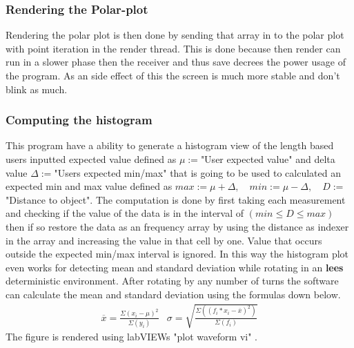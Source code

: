 \subsubsection{Rendering the Polar-plot}\label{subsubsection:renderPolar}
Rendering the polar plot is then done by sending that array in to the polar plot with point iteration\cite{labVIEW-polar-plot} in the render thread.
This is done because then render can run in a slower phase then the receiver and thus save decrees the power usage of the program.
As an side effect of this the screen is much more stable and don't blink as much.

\subsubsection{Computing the histogram}\label{subsubsection:comphistogram}
This program have a ability to generate a histogram view of the length based users inputted expected value defined as $\mu:=$"User expected value" and delta value $\Delta:=$"Users expected min/max" that is going to be used to calculated an expected min and max value defined as $ max:=\mu+\Delta,\quad min:=\mu-\Delta, \quad D:=$"Distance to object".
The computation is done by first taking each measurement and checking if the value of the data is in the interval of $ (min \leq D \leq max) $ then if so restore the data as an frequency array by using the distance as indexer in the array and increasing the value in that cell by one.
Value that occurs outside the expected min/max interval is ignored.
In this way the histogram plot even works for detecting mean and standard deviation while rotating in an \textbf{lees} deterministic environment.
After rotating by any number of turns the software can calculate the mean and standard deviation using the formulas down below.
$$\begin{matrix} 
\overline{x}=\frac{\Sigma(x_i-\mu)^2}{\Sigma(y_i)} & 
\sigma= \sqrt{\frac{\Sigma((f_i*x_i-\overline{x})^2)}{\Sigma(f_i)}}
\end{matrix}\label{equation:mean-and-div}$$
The figure is rendered using labVIEWs "plot waveform vi" \cite{labVIEW-Plot-Waveform-VI}.
